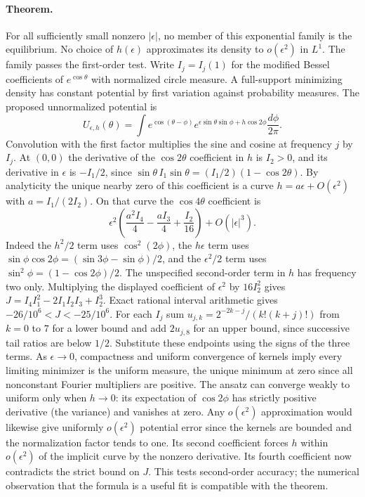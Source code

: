\documentclass[10pt]{article}
\begin{document}
\paragraph{Theorem.} For all sufficiently small nonzero $|\epsilon|$, no member of this exponential family is the equilibrium. No choice of $h(\epsilon)$ approximates its density to $o(\epsilon^2)$ in $L^1$. The family passes the first-order test.
Write $I_j=I_j(1)$ for the modified Bessel coefficients of $e^{\cos\theta}$ with normalized circle measure. A full-support minimizing density has constant potential by first variation against probability measures. The proposed unnormalized potential is
\[
 U_{\epsilon,h}(\theta)=\int e^{\cos(\theta-\phi)} e^{\epsilon\sin\theta\sin\phi+h\cos 2\phi}\frac{d\phi}{2\pi}.
\]
Convolution with the first factor multiplies the sine and cosine at frequency $j$ by $I_j$. At $(0,0)$ the derivative of the $\cos 2\theta$ coefficient in $h$ is $I_2>0$, and its derivative in $\epsilon$ is $-I_1/2$, since $\sin\theta\,I_1\sin\theta=(I_1/2)(1-\cos2\theta)$. By analyticity the unique nearby zero of this coefficient is a curve $h=a\epsilon+O(\epsilon^2)$ with $a=I_1/(2I_2)$.
On that curve the $\cos4\theta$ coefficient is
\[
 \epsilon^2\left(\frac{a^2I_4}{4}-\frac{a I_3}{4}+\frac{I_2}{16}\right)+O(|\epsilon|^3).
\]
Indeed the $h^2/2$ term uses $\cos^2(2\phi)$, the $h\epsilon$ term uses $\sin\phi\cos 2\phi=(\sin3\phi-\sin\phi)/2$, and the $\epsilon^2/2$ term uses $\sin^2\phi=(1-\cos2\phi)/2$. The unspecified second-order term in $h$ has frequency two only. Multiplying the displayed coefficient of $\epsilon^2$ by $16I_2^2$ gives $J=I_4I_1^2-2I_1I_2I_3+I_2^3$. Exact rational interval arithmetic gives $-26/10^6<J<-25/10^6$. For each $I_j$ sum $u_{j,k}=2^{-2k-j}/(k!(k+j)!)$ from $k=0$ to $7$ for a lower bound and add $2u_{j,8}$ for an upper bound, since successive tail ratios are below $1/2$. Substitute these endpoints using the signs of the three terms.
As $\epsilon\to0$, compactness and uniform convergence of kernels imply every limiting minimizer is the uniform measure, the unique minimum at zero since all nonconstant Fourier multipliers are positive. The ansatz can converge weakly to uniform only when $h\to0$: its expectation of $\cos2\phi$ has strictly positive derivative (the variance) and vanishes at zero. Any $o(\epsilon^2)$ approximation would likewise give uniformly $o(\epsilon^2)$ potential error since the kernels are bounded and the normalization factor tends to one. Its second coefficient forces $h$ within $o(\epsilon^2)$ of the implicit curve by the nonzero derivative. Its fourth coefficient now contradicts the strict bound on $J$. This tests second-order accuracy; the numerical observation that the formula is a useful fit is compatible with the theorem.
\end{document}
